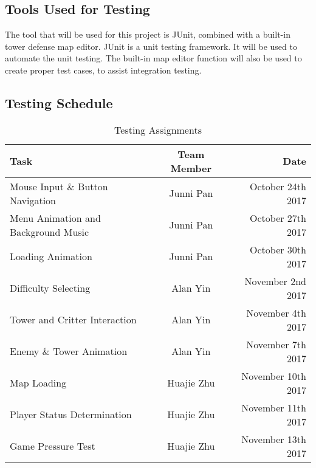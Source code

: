 \documentclass[12pt]{article}
\begin{document}
	\subsection{Tools Used for Testing}
	The tool that will be used for this project is JUnit, combined with a built-in tower defense map editor. JUnit is a unit testing framework. It will be used to automate the unit testing. The built-in map editor function will also be used to create proper test cases, to assist integration testing.
	
	\subsection{Testing Schedule}
		
	\begin{table}[!htbp]
    \centering
	\begin{tabular}[pos]{|l|c|r|}
		
		\hline
		\textbf{Task}& \textbf{Team Member} & \textbf{Date} \\ \hline
		Mouse Input \& Button Navigation & Junni Pan & October 24th 2017\\ \hline
		Menu Animation and Background Music & Junni Pan & October 27th 2017\\ \hline
		Loading Animation & Junni Pan & October 30th 2017\\ \hline
		Difficulty Selecting & Alan Yin & November 2nd 2017\\ \hline
		Tower and Critter Interaction & Alan Yin & November 4th 2017 \\ \hline
		Enemy \& Tower Animation & Alan Yin & November 7th 2017\\ \hline
		Map Loading & Huajie Zhu & November 10th 2017 \\ \hline
		Player Status Determination & Huajie Zhu & November 11th 2017 \\ \hline 
		Game Pressure Test & Huajie Zhu & November 13th 2017\\ \hline
		
	\end{tabular}
		\caption{Testing Assignments}
		\label{Table}
	
\end{table}

\newpage	
\end{document}
